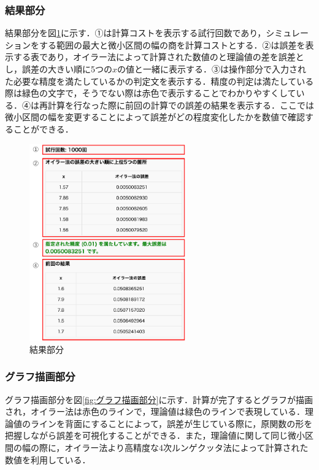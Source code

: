 \documentclass[a4paper, 12pt]{ltjsarticle}
\begin{document}
\subsubsection{結果部分}
結果部分を図\ref{fig:結果部分}に示す．①は計算コストを表示する試行回数であり，シミュレーションをする範囲の最大と微小区間の幅の商を計算コストとする．②は誤差を表示する表であり，オイラー法によって計算された数値のと理論値の差を誤差とし，誤差の大きい順に5つの$x$の値と一緒に表示する．③は操作部分で入力された必要な精度を満たしているかの判定文を表示する．精度の判定は満たしている際は緑色の文字で，そうでない際は赤色で表示することでわかりやすくしている．④は再計算を行なった際に前回の計算での誤差の結果を表示する．ここでは微小区間の幅を変更することによって誤差がどの程度変化したかを数値で確認することができる．

\begin{figure}[h]
\begin{center}
\includegraphics[clip,width=0.6\textwidth,keepaspectratio]{sim-kekka.pdf}
\end{center}
\caption{結果部分}
\label{fig:結果部分}
\end{figure}

\clearpage

\subsubsection{グラフ描画部分}
グラフ描画部分を図\ref{fig:グラフ描画部分}に示す．計算が完了するとグラフが描画され，オイラー法は赤色のラインで，理論値は緑色のラインで表現している．理論値のラインを背面にすることによって，誤差が生じている際に，原関数の形を把握しながら誤差を可視化することができる．また，理論値に関して同じ微小区間の幅の際に，オイラー法より高精度な4次ルンゲクッタ法によって計算された数値を利用している．
\end{document}
